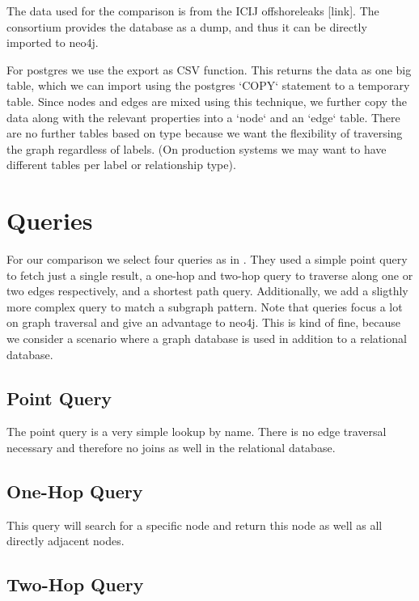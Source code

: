 \documentclass[11pt, a4paper,oneside,chapterprefix=false]{scrbook}
\begin{document}
The data used for the comparison is from the ICIJ offshoreleaks [link].
The consortium provides the database as a dump, and thus it can be directly imported to neo4j.

For postgres we use the export as CSV function.
This returns the data as one big table, which we can import using the postgres `COPY` statement to a temporary table.
Since nodes and edges are mixed using this technique, we further copy the data along with the relevant properties into a `node` and an `edge` table.
There are no further tables based on type because we want the flexibility of traversing the graph regardless of labels.
(On production systems we may want to have different tables per label or relationship type).

\section{Queries} \label{sec:benchmark}

For our comparison we select four queries as in \cite{graphdbbenchmark}.
They used a simple point query to fetch just a single result, a one-hop and two-hop query to traverse along one or two edges respectively, and a shortest path query.
Additionally, we add a sligthly more complex query to match a subgraph pattern.
Note that queries focus a lot on graph traversal and give an advantage to neo4j.
This is kind of fine, because we consider a scenario where a graph database is used in addition to a relational database.

\subsection{Point Query}

The point query is a very simple lookup by name.
There is no edge traversal necessary and therefore no joins as well in the relational database.

\subsection{One-Hop Query}

This query will search for a specific node and return this node as well as all directly adjacent nodes.

\subsection{Two-Hop Query}
\end{document}
